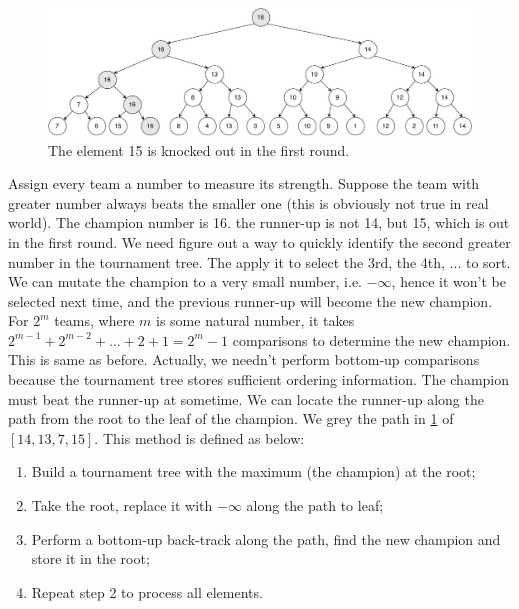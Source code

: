 \documentclass[b5paper]{article}
\begin{document}
\begin{figure}[htbp]
  \centering
  \includegraphics[scale=0.28]{img/tournament-tree-1}
  \caption{The element 15 is knocked out in the first round.}
  \label{fig:tournament-tree-1}
\end{figure}

Assign every team a number to measure its strength. Suppose the team with greater number always beats the smaller one (this is obviously not true in real world). The champion number is 16. the runner-up is not 14, but 15, which is out in the first round. We need figure out a way to quickly identify the second greater number in the tournament tree. The apply it to select the 3rd, the 4th, ... to sort. We can mutate the champion to a very small number, i.e. $-\infty$, hence it won't be selected next time, and the previous runner-up will become the new champion. For $2^m$ teams, where $m$ is some natural number, it takes $2^{m-1} + 2^{m-2} + ... + 2 + 1 = 2^m - 1$ comparisons to determine the new champion. This is same as before. Actually, we needn't perform bottom-up comparisons because the tournament tree
stores sufficient ordering information. The champion must beat the runner-up at sometime. We can locate the runner-up along the path from the root to the leaf of the champion. We grey the path in \cref{fig:tournament-tree-1} of $[14, 13, 7, 15]$. This method is defined as below:

\begin{enumerate}
\item Build a tournament tree with the maximum (the champion) at the root;
\item Take the root, replace it with $-\infty$ along the path to leaf;
\item Perform a bottom-up back-track along the path, find the new champion and store it in the root;
\item Repeat step 2 to process all elements.
\end{enumerate}
\end{document}
